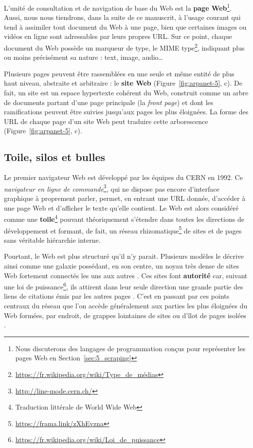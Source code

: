 \documentclass[symmetric,justified,marginals=raggedouter]{tufte-book}
\begin{document}
L'unité de consultation et de navigation de base du Web est la \textbf{page Web}\footnote{\RaggedOuter Nous discuterons des langages de programmation conçus pour représenter les pages Web en Section~\ref{sec:5_scraping}}. Aussi, nous nous tiendrons, dans la suite de ce manuscrit, à l'usage courant qui tend à assimiler tout document du Web à une page, bien que certaines images ou vidéos en ligne sont adressables par leurs propres URL. Sur ce point, chaque document du Web possède un marqueur de type, le MIME type\footnote{\RaggedOuter \url{https://fr.wikipedia.org/wiki/Type\_de\_médias}}, indiquant plus ou moins précisément sa nature : text, image, audio\ldots{} 

Plusieurs pages peuvent être rassemblées en une seule et même entité de plus haut niveau, abstraite et arbitraire : le \textbf{site Web} (Figure~\ref{fig:arpanet-5}, c). De fait, un site est un espace hypertexte cohérent du Web, construit comme un arbre de documents partant d'une page principale (la \textit{front page}) et dont les ramifications peuvent être suivies jusqu'aux pages les plus éloignées. La forme des URL de chaque page d'un site Web peut traduire cette arborescence (Figure~\ref{fig:arpanet-5}, c).  

\subsection{Toile, silos et bulles} 

\noindent Le premier navigateur Web est développé par les équipes du CERN en 1992. Ce \textit{navigateur en ligne de commande}\footnote{\RaggedOuter \url{http://line-mode.cern.ch/}}, qui ne dispose pas encore d'interface graphique à proprement parler, permet, en entrant une URL donnée, d'accéder à une page Web et d'afficher le texte qu'elle contient. Le Web est alors considéré comme une \textbf{toile}\footnote{\RaggedOuter Traduction littérale de World Wide Web} pouvant théoriquement s'étendre dans toutes les directions de développement et formant, de fait, un réseau rhizomatique\footnote{\RaggedOuter \url{https://frama.link/zXhEvzna}} de sites et de pages sans véritable hiérarchie interne. 

Pourtant, le Web est plus structuré qu'il n'y parait. Plusieurs modèles le décrive ainsi comme une galaxie possédant, en son centre, un noyau très dense de sites Web fortement connectés les uns aux autres \citep{broder_graph_2000}. Ces sites font \textbf{autorité} car, suivant une loi de puissance\footnote{\RaggedOuter \url{https://fr.wikipedia.org/wiki/Loi\_de\_puissance}}, ils attirent dans leur seule direction une grande partie des liens de citations émis par les autres pages \citep{barabasi_scale-free_2000}. C'est en passant par ces points centraux du réseau que l'on accède généralement aux parties les plus éloignées du Web formées, par endroit, de grappes lointaines de sites ou d'îlot de pages isolées \citep{kumar_stochastic_2000}.
\end{document}
